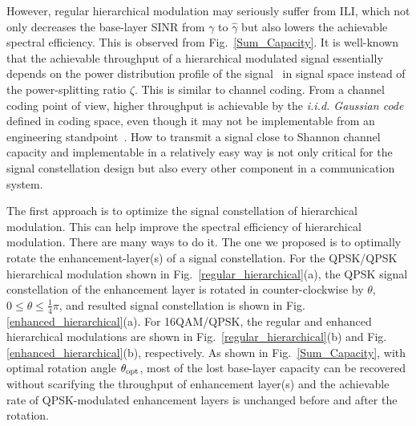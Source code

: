 \documentclass[10pt,fleqn, twocolumn]{IEEEtran}
\begin{document}
However, regular hierarchical modulation may seriously suffer from
ILI, which not only decreases the base-layer SINR from ${\gamma}$
to $\hat{\gamma}$ but also lowers the achievable spectral
efficiency. This is observed from Fig.~\ref{Sum_Capacity}. It is
well-known that the achievable throughput of a hierarchical
modulated signal essentially depends on the power distribution
profile of the signal~\cite{Unge82} in signal space instead of the
power-splitting ratio $\zeta$. This is similar to channel coding.
From a channel coding point of view, higher throughput is
achievable by the {\em i.i.d. Gaussian code} defined in coding
space, even though it may not be implementable from an engineering
standpoint~\cite{Cover72}. How to transmit a signal close to
Shannon channel capacity and implementable in a relatively easy
way is not only critical for the signal constellation design but
also every other component in a communication system.

The first approach is to optimize the signal constellation of
hierarchical modulation. This can help improve the spectral
efficiency of hierarchical modulation. There are many ways to do
it. The one we proposed is to optimally rotate the
enhancement-layer(s) of a signal constellation. For the QPSK/QPSK
hierarchical modulation shown in
Fig.~\ref{regular_hierarchical}(a), the QPSK signal constellation
of the enhancement layer is rotated in counter-clockwise by
$\theta$, $0\leq\theta\leq\frac{1}{4}\pi$, and resulted signal
constellation is shown in Fig. \ref{enhanced_hierarchical}(a). For
16QAM/QPSK, the regular and enhanced hierarchical modulations are
shown in Fig.~\ref{regular_hierarchical}(b) and Fig.
\ref{enhanced_hierarchical}(b), respectively.  As shown in
Fig.~\ref{Sum_Capacity}, with optimal rotation angle $\theta_{\rm
opt}$, most of the lost base-layer capacity can be recovered
without scarifying the throughput of enhancement layer(s) and the
achievable rate of QPSK-modulated enhancement layers is unchanged
before and after the rotation.
\begin{figure}
\end{figure}
\end{document}
